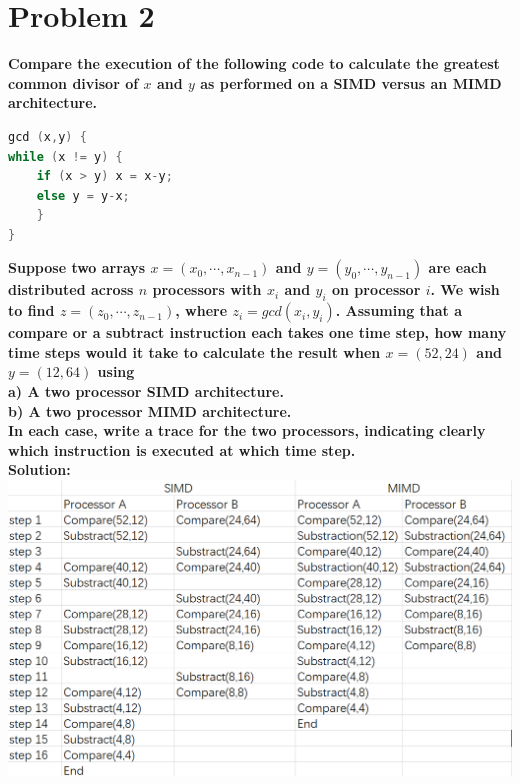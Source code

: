 \documentclass{article}
\begin{document}
\section{Problem 2}
\textcolor[rgb]{0,0,1}{\textbf{Compare the execution of the following code to calculate the greatest common divisor of $x$ and $y$ as performed on a SIMD versus an MIMD architecture. }}
\begin{lstlisting}[language=c++]
gcd (x,y) {
while (x != y) {
    if (x > y) x = x-y;
    else y = y-x;
    }
}
\end{lstlisting}
\textcolor[rgb]{0,0,1}{\textbf{Suppose two arrays $x = (x_{0},\cdots, x_{n-1})$ and $y = (y_{0},\cdots, y_{n-1})$ are each distributed across $n$ processors with $x_{i}$ and $y_{i}$ on processor $i$. We wish to find $z = (z_{0},\cdots, z_{n-1})$, where $z_{i} = gcd(x_{i}, y_{i})$. Assuming that a compare or a subtract instruction 
each takes one time step, how many time steps would it take to calculate the 
result when $x = (52,24)$ and $y = (12, 64)$ using\\
a) A two processor SIMD architecture. \\ 
b) A two processor MIMD architecture. \\
In each case, write a trace for the two processors, indicating clearly which 
instruction is executed at which time step.\\}}
\textbf{Solution: }\\
\includegraphics[scale=0.4]{list1.png}
\end{document}
